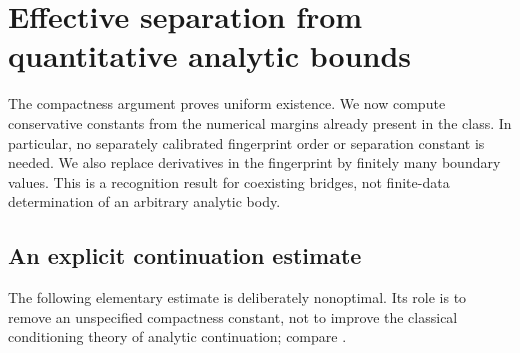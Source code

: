 \section{Effective separation from quantitative analytic bounds}
\label{sec:effective}
The compactness argument proves uniform existence. We now compute
conservative constants from the numerical margins already present in
the class. In particular, no separately calibrated fingerprint order or
separation constant is needed. We also replace derivatives in the
fingerprint by finitely many boundary values. This is a recognition
result for coexisting bridges, not finite-data determination of an
arbitrary analytic body.

\subsection{An explicit continuation estimate}
The following elementary estimate is deliberately nonoptimal. Its role
is to remove an unspecified compactness constant, not to improve the
classical conditioning theory of analytic continuation; compare
\cite{Trefethen}.

